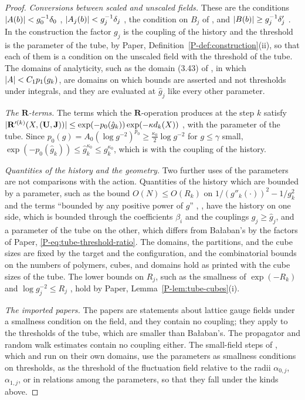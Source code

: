 \documentclass[11pt]{preprint}
\DeclarePairedDelimiter{\abs}{\lvert}{\rvert}
\numberwithin{equation}{section}
\theoremstyle{definition}
\theoremstyle{remark}
\theoremstyle{plain}
\begin{document}
\begin{proof}
\emph{Conversions between scaled and unscaled fields.} These are the conditions $\abs{A(b)} < g_0^{-1}\delta_0$ \cite[p.~250]{BalabanCRE}, $\abs{A_j(b)} < g_j^{-1}\delta_j$ \cite[(1.9), p.~178]{BalabanLFR1}, the condition on $B_j$ of \cite[(1.55), p.~188]{BalabanLFR1}, and $\abs{B(b)} \geq g_j^{-1}\delta'_j$ \cite[p.~383]{BalabanLFR2}. In the construction the factor $g_j$ is the coupling of the history and the threshold is the parameter of the tube, by Paper, Definition~\ref{P-def:construction}(ii), so that each of them is a condition on the unscaled field with the threshold of the tube. The domains of analyticity, such as the domain (3.43) of \cite[p.~276]{BalabanCRE}, in which $\abs{A} < C_1p_1(g_k)$, are domains on which bounds are asserted and not thresholds under integrals, and they are evaluated at $\hat g_j$ like every other parameter.

\emph{The $\mathbf R$-terms.} The terms which the $\mathbf R$-operation produces at the step $k$ satisfy $\abs{\mathbf R'^{(k)}(X, (\mathbf U, \mathbf J))} \leq \exp(-p_0(\hat g_k))\exp(-\kappa d_k(X))$ \cite[p.~390]{BalabanLFR2}, with the parameter of the tube. Since $p_0(g) = A_0(\log g^{-2})^{p_0} \geq \frac{\kappa_0}{2}\log g^{-2}$ for $g \leq \gamma$ small, $\exp(-p_0(\hat g_k)) \leq \hat g_k^{\kappa_0} \leq g_k^{\kappa_0}$, which is \cite[(2.31), p.~260]{BalabanCRE} with the coupling of the history.

\emph{Quantities of the history and the geometry.} Two further uses of the parameters are not comparisons with the action. Quantities of the history which are bounded by a parameter, such as the bound $O(N) \leq O(R_k)$ on $1/(g''_k(\cdot))^2 - 1/g_k^2$ \cite[p.~366]{BalabanLFR2} and the terms ``bounded by any positive power of $g$'' \cite[pp.~252, 269]{BalabanCRE}, \cite[p.~188]{BalabanLFR1}, have the history on one side, which is bounded through the coefficients $\beta_i$ and the couplings $g_j \geq \hat g_j$, and a parameter of the tube on the other, which differs from Ba{\l}aban's by the factors of Paper, \eqref{P-eq:tube-threshold-ratio}. The domains, the partitions, and the cube sizes are fixed by the target and the configuration, and the combinatorial bounds on the numbers of polymers, cubes, and domains hold as printed with the cube sizes of the tube. The lower bounds on $R_j$, such as the smallness of $\exp(-R_k)$ \cite[pp.~266, 268, 269]{BalabanCRE} and $\log g_j^{-2} \leq R_j$ \cite[p.~380]{BalabanLFR2}, hold by Paper, Lemma~\ref{P-lem:tube-cubes}(i).

\emph{The imported papers.} The papers \cite{BalabanAVG,BalabanVAR,BalabanREG} are statements about lattice gauge fields under a smallness condition on the field, and they contain no coupling; they apply to the thresholds of the tube, which are smaller than Ba{\l}aban's. The propagator and random walk estimates \cite{BalabanPBG,BalabanPRT1,BalabanPRT2} contain no coupling either. The small-field steps of \cite{BalabanRG1,BalabanRG2}, which \cite{BalabanCRE} and \cite{BalabanLFR2} run on their own domains, use the parameters as smallness conditions on thresholds, as the threshold of the fluctuation field relative to the radii $\alpha_{0,j}$, $\alpha_{1,j}$, or in relations among the parameters, so that they fall under the kinds above.


\end{proof}
\end{document}
